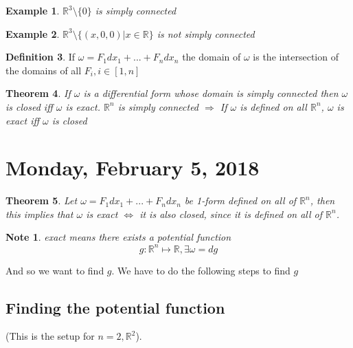 \documentclass[12pt]{article}
\theoremstyle{plain}
\newtheorem*{note}{Note}
\newtheorem{theorem}{Theorem}[section]
\newtheorem{example}[theorem]{Example}
\theoremstyle{definition}
\newtheorem{definition}[theorem]{Definition}
\begin{document}
\begin{example}
  $\mathbb{R}^3 \setminus \{ 0 \}$ is simply connected
\end{example}

\begin{example}
  $\mathbb{R}^3 \setminus \{ (x,0,0) | x\in \mathbb{R} \}$ is not simply connected
\end{example}

\begin{definition}
  If $\omega = F_1 dx_1 + ... + F_n dx_n$ the domain of $\omega$ is the intersection of the domains of all $F_i, i\in [1,n]$
\end{definition}

\begin{theorem}
  If $\omega$ is a differential form whose domain is simply connected then $\omega$ is closed iff $\omega$ is exact. $\mathbb{R}^n$ is simply connected $\Longrightarrow$ If $\omega$ is defined on all $\mathbb{R}^n$, $\omega$ is exact iff $\omega$ is closed
\end{theorem}

\newpage

\section{Monday, February 5, 2018}

\begin{theorem}
	Let $\omega = F_1 dx_1 + ... + F_n dx_n$ be 1-form defined on all of $\mathbb{R}^n$, then this implies that $\omega$ is exact $\Longleftrightarrow$ it is also closed, since it is defined on all of $\mathbb{R}^n$.
\end{theorem}

\begin{note}
	exact means there exists a potential function $$g:\mathbb{R}^n \mapsto \mathbb{R}, \exists \omega = dg$$
\end{note}

And so we want to find $g$. We have to do the following steps to find $g$

\subsection{Finding the potential function}

(This is the setup for $n=2, \mathbb{R}^2$).
\end{document}
